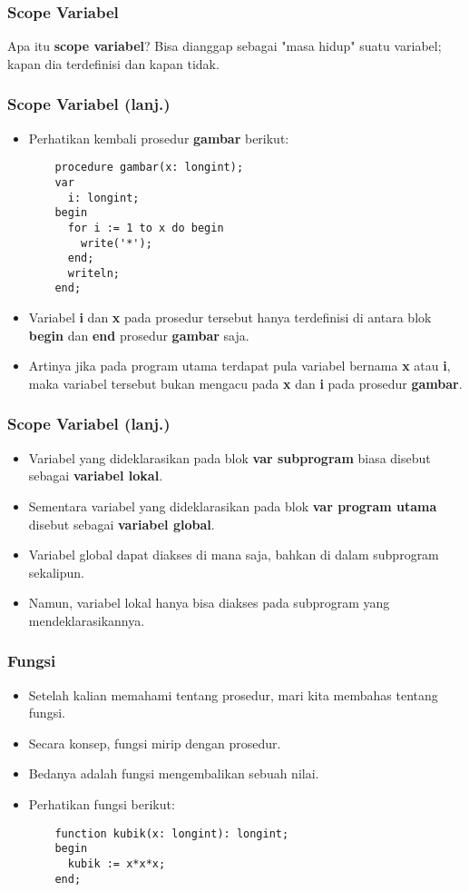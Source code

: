 \documentclass{beamer}
\begin{document}
\begin{frame}[fragile]
\frametitle{Scope Variabel}
\begin{block}{Apa itu \textbf{scope variabel}?}
Bisa dianggap sebagai "masa hidup" suatu variabel; kapan dia terdefinisi dan kapan tidak.
\end{block}
\end{frame}

\begin{frame}[fragile]
\frametitle{Scope Variabel (lanj.)}
\begin{itemize}
  \item Perhatikan kembali prosedur \textbf{gambar} berikut:
  \begin{lstlisting}
    procedure gambar(x: longint);
    var
      i: longint;
    begin
      for i := 1 to x do begin
        write('*');
      end;
      writeln;
    end;
  \end{lstlisting}
  \item Variabel \textbf{i} dan \textbf{x} pada prosedur tersebut hanya terdefinisi di antara blok \textbf{begin} dan \textbf{end} prosedur \textbf{gambar} saja.
  \item Artinya jika pada program utama terdapat pula variabel bernama \textbf{x} atau \textbf{i}, maka variabel tersebut \alert{bukan} mengacu pada \textbf{x} dan \textbf{i} pada prosedur \textbf{gambar}.
\end{itemize}
\end{frame}

\begin{frame}[fragile]
\frametitle{Scope Variabel (lanj.)}
\begin{itemize}
  \item Variabel yang dideklarasikan pada blok \textbf{var subprogram} biasa disebut sebagai \textbf{variabel lokal}.
  \item Sementara variabel yang dideklarasikan pada blok \textbf{var program utama} disebut sebagai \textbf{variabel global}.
  \item Variabel global dapat diakses di mana saja, bahkan di dalam subprogram sekalipun.
  \item Namun, variabel lokal hanya bisa diakses pada subprogram yang mendeklarasikannya.
\end{itemize}
\end{frame}

\begin{frame}[fragile]
\frametitle{Fungsi}
\begin{itemize}
  \item Setelah kalian memahami tentang prosedur, mari kita membahas tentang fungsi.
  \item Secara konsep, fungsi mirip dengan prosedur.
  \item Bedanya adalah fungsi \alert{mengembalikan sebuah nilai}.
  \item Perhatikan fungsi berikut:
  \begin{lstlisting}
    function kubik(x: longint): longint;
    begin
      kubik := x*x*x;
    end;
  \end{lstlisting}
\end{itemize}
\end{frame}
\end{document}
